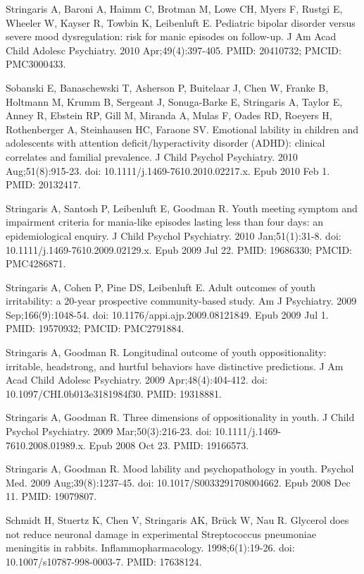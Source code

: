 \documentclass[
]{article}
\begin{document}
Stringaris A, Baroni A, Haimm C, Brotman M, Lowe CH, Myers F, Rustgi E,
Wheeler W, Kayser R, Towbin K, Leibenluft E. Pediatric bipolar disorder
versus severe mood dysregulation: risk for manic episodes on follow-up.
J Am Acad Child Adolesc Psychiatry. 2010 Apr;49(4):397-405. PMID:
20410732; PMCID: PMC3000433.

Sobanski E, Banaschewski T, Asherson P, Buitelaar J, Chen W, Franke B,
Holtmann M, Krumm B, Sergeant J, Sonuga-Barke E, Stringaris A, Taylor E,
Anney R, Ebstein RP, Gill M, Miranda A, Mulas F, Oades RD, Roeyers H,
Rothenberger A, Steinhausen HC, Faraone SV. Emotional lability in
children and adolescents with attention deficit/hyperactivity disorder
(ADHD): clinical correlates and familial prevalence. J Child Psychol
Psychiatry. 2010 Aug;51(8):915-23. doi:
10.1111/j.1469-7610.2010.02217.x. Epub 2010 Feb 1. PMID: 20132417.

Stringaris A, Santosh P, Leibenluft E, Goodman R. Youth meeting symptom
and impairment criteria for mania-like episodes lasting less than four
days: an epidemiological enquiry. J Child Psychol Psychiatry. 2010
Jan;51(1):31-8. doi: 10.1111/j.1469-7610.2009.02129.x. Epub 2009 Jul 22.
PMID: 19686330; PMCID: PMC4286871.

Stringaris A, Cohen P, Pine DS, Leibenluft E. Adult outcomes of youth
irritability: a 20-year prospective community-based study. Am J
Psychiatry. 2009 Sep;166(9):1048-54. doi:
10.1176/appi.ajp.2009.08121849. Epub 2009 Jul 1. PMID: 19570932; PMCID:
PMC2791884.

Stringaris A, Goodman R. Longitudinal outcome of youth oppositionality:
irritable, headstrong, and hurtful behaviors have distinctive
predictions. J Am Acad Child Adolesc Psychiatry. 2009 Apr;48(4):404-412.
doi: 10.1097/CHI.0b013e3181984f30. PMID: 19318881.

Stringaris A, Goodman R. Three dimensions of oppositionality in youth. J
Child Psychol Psychiatry. 2009 Mar;50(3):216-23. doi:
10.1111/j.1469-7610.2008.01989.x. Epub 2008 Oct 23. PMID: 19166573.

Stringaris A, Goodman R. Mood lability and psychopathology in youth.
Psychol Med. 2009 Aug;39(8):1237-45. doi: 10.1017/S0033291708004662.
Epub 2008 Dec 11. PMID: 19079807.

Schmidt H, Stuertz K, Chen V, Stringaris AK, Brück W, Nau R. Glycerol
does not reduce neuronal damage in experimental Streptococcus pneumoniae
meningitis in rabbits. Inflammopharmacology. 1998;6(1):19-26. doi:
10.1007/s10787-998-0003-7. PMID: 17638124.
\end{document}
